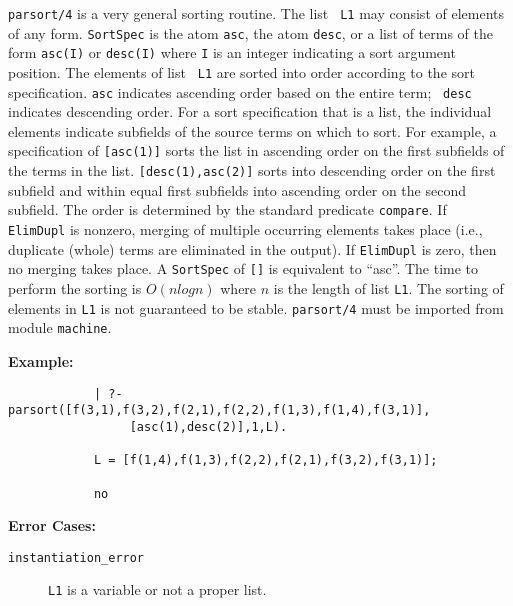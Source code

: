 \begin{description}
%
    {\tt parsort/4} is a very general sorting routine.  The list {\tt
    L1} may consist of elements of any form.  {\tt SortSpec} is the
    atom {\tt asc}, the atom {\tt desc}, or a list of terms of the
    form {\tt asc(I)} or {\tt desc(I)} where {\tt I} is an integer
    indicating a sort argument position.  The elements of list {\tt
    L1} are sorted into order according to the sort specification.
    {\tt asc} indicates ascending order based on the entire term; {\tt
    desc} indicates descending order.  For a sort specification that
    is a list, the individual elements indicate subfields of the
    source terms on which to sort.  For example, a specification of
    {\tt [asc(1)]} sorts the list in ascending order on the first
    subfields of the terms in the list.  {\tt [desc(1),asc(2)]} sorts
    into descending order on the first subfield and within equal first
    subfields into ascending order on the second subfield.  The order
    is determined by the standard predicate {\tt compare}.  If {\tt
    ElimDupl} is nonzero, merging of multiple occurring elements takes
    place (i.e., duplicate (whole) terms are eliminated in the
    output).  If {\tt ElimDupl} is zero, then no merging takes place.
    A {\tt SortSpec} of {\tt []} is equivalent to ``asc''.  The time
    to perform the sorting is $O(n log n)$ where $n$ is the length of
    list {\tt L1}.  The sorting of elements in {\tt L1} is not
    guaranteed to be stable. {\tt parsort/4} must be imported from
    module {\tt machine}.

{\bf     Example:}
    {\footnotesize
     \begin{verbatim}
            | ?- parsort([f(3,1),f(3,2),f(2,1),f(2,2),f(1,3),f(1,4),f(3,1)],
                 [asc(1),desc(2)],1,L). 

            L = [f(1,4),f(1,3),f(2,2),f(2,1),f(3,2),f(3,1)];

            no \end{verbatim}}

{\bf Error Cases:}
\begin{description} 
\item[{\tt instantiation\_error}]
     {\tt L1} is a variable or not a proper list.  
\end{description}
\end{description}

